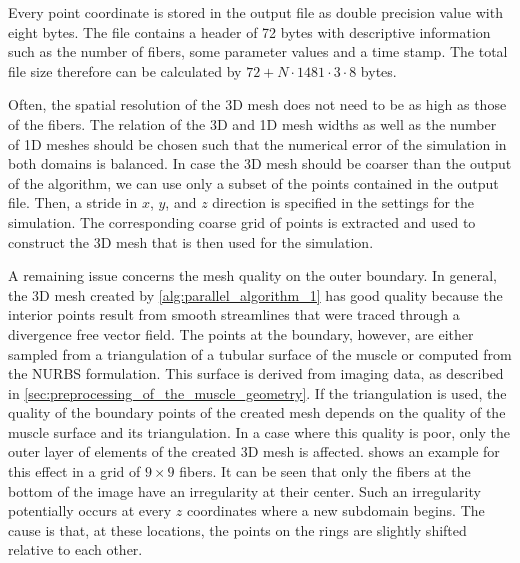 Every point coordinate is stored in the output file as double precision value with eight bytes. The file contains a header of 72 bytes with descriptive information such as the number of fibers, some parameter values and a time stamp. The total file size therefore can be calculated by $72+N\cdot 1481\cdot 3\cdot 8$ bytes.

Often, the spatial resolution of the 3D mesh does not need to be as high as those of the fibers. The relation of the 3D and 1D mesh widths as well as the number of 1D meshes should be chosen such that the numerical error of the simulation in both domains is balanced.
In case the 3D mesh should be coarser than the output of the algorithm, we can use only a subset of the points contained in the output file. Then, a stride in $x$, $y$, and $z$ direction is specified in the settings for the simulation. The corresponding coarse grid of points is extracted and used to construct the 3D mesh that is then used for the simulation.


A remaining issue concerns the mesh quality on the outer boundary. In general, the 3D mesh created by \cref{alg:parallel_algorithm_1} has good quality because the interior points result from smooth streamlines that were traced through a divergence free vector field. 
The points at the boundary, however, are either sampled from a triangulation of a tubular surface of the muscle or computed from the NURBS formulation. This surface is derived from imaging data, as described in \cref{sec:preprocessing_of_the_muscle_geometry}. If the triangulation is used, the quality of the boundary points of the created mesh depends on the quality of the muscle surface and its triangulation. In a case where this quality is poor, only the outer layer of elements of the created 3D mesh is affected.  shows an example for this effect in a grid of $9 \times 9$ fibers. It can be seen that only the fibers at the bottom of the image have an irregularity at their center. Such an irregularity potentially occurs at every $z$ coordinates where a new subdomain begins. The cause is that, at these locations, the points on the rings are slightly shifted relative to each other.


